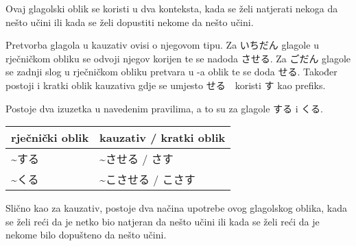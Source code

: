 
\author{Kristijan Čavić}

	
	Ovaj glagolski oblik se koristi u dva konteksta, kada se želi natjerati nekoga da nešto učini ili kada se želi dopustiti nekome da nešto učini.
	
	Pretvorba glagola u kauzativ ovisi o njegovom tipu.
	Za いちだん glagole u rječničkom obliku se odvoji njegov korijen te se nadoda させる.
	Za ごだん glagole se zadnji slog u rječničkom obliku pretvara u -a oblik te se doda せる.
	Također postoji i kratki oblik kauzativa gdje se umjesto せる　koristi す kao prefiks.
	
	\begin{reibun}
	\end{reibun}
	
	Postoje dva izuzetka u navedenim pravilima, a to su za glagole する i くる.
	\begin{table}[h]
		\centering
		\begin{tabular}{l l}\toprule[2pt]
			rječnički oblik & kauzativ / kratki oblik\\
			\midrule
			\textasciitilde する　& \textasciitilde させる / さす\\
			\textasciitilde くる　&\textasciitilde こさせる / こさす\\
			\bottomrule[2pt]
		\end{tabular}
	\end{table}
	
	
		
	Slično kao za kauzativ, postoje dva načina upotrebe ovog glagolskog oblika, kada se želi reći da je netko bio natjeran da nešto učini ili kada se želi reći da je nekome bilo dopušteno da nešto učini.
	
